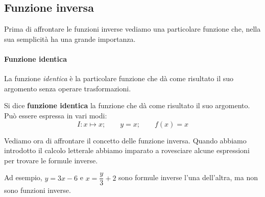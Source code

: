 \subsection{Funzione inversa}

Prima di affrontare le funzioni inverse vediamo una particolare funzione che,
nella sua semplicità ha una grande importanza.

\paragraph{Funzione identica}

La funzione \emph{identica} è la particolare funzione che dà come risultato 
il suo argomento senza operare trasformazioni. 

\begin{definizione}
Si dice \textbf{funzione identica} la funzione che dà come risultato il 
suo argomento.
Può essere espressa in vari modi:
\[I: x \mapsto x; \qquad y = x; \qquad f(x) = x\]
\end{definizione}

Vediamo ora di affrontare il concetto delle funzione inversa.
Quando abbiamo introdotto il calcolo letterale abbiamo imparato a 
rovesciare alcune espressioni per trovare le formule inverse.

Ad esempio, \(y = 3x -6\) e \(x = \dfrac{y}{3} +2\) 
sono formule inverse l'una dell'altra, ma non sono funzioni inverse.


